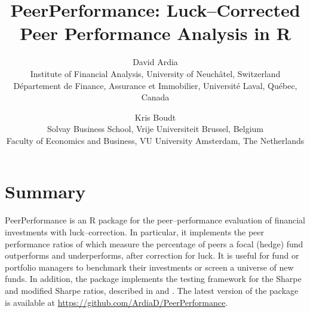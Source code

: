 \documentclass[11pt]{article}
\begin{document}
\title{PeerPerformance: Luck--Corrected Peer Performance Analysis in R}
\author{David Ardia\\
Institute of Financial Analysis, University of Neuch\^atel, Switzerland\\
D\'epartement de Finance, Assurance et Immobilier, Universit\'e Laval, Qu\'ebec, Canada
\and
Kris Boudt\\
Solvay Business School, Vrije Universiteit Brussel, Belgium\\
Faculty of Economics and Business, VU University Amsterdam, The Netherlands
}
	
\maketitle

\section*{Summary}

PeerPerformance is an R package for the peer--performance evaluation of financial investments with luck--correction. In particular, it implements the peer performance ratios of \citet{ArdiaBoudt2018} which measure the percentage of peers 
a focal (hedge) fund outperforms and underperforms, after correction
for luck. It is useful for fund or portfolio managers to benchmark their investments or screen a universe of new funds. In addition, the package implements the testing framework for the Sharpe and modified Sharpe ratios, described in \citet{LedoitWolf2008} and \citet{ArdiaBoudt2015}. The latest version of the package
is available at \url{https://github.com/ArdiaD/PeerPerformance}.



	
\end{document}
